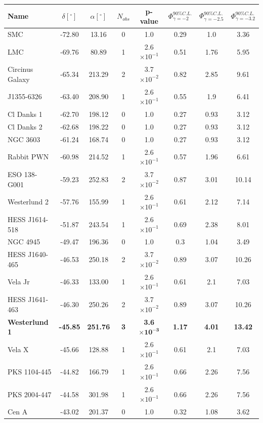 \begin{longtable}{lccccccc}
\hline
Name	&	$\delta [^{\circ}]$	&	$\alpha [^{\circ}]$	&	$N_{obs}$	&	p-value	&	$\Phi^{90\% C.L.}_{\gamma = -2}$	&	$\Phi^{90\% C.L.}_{\gamma = -2.5}$	&	$\Phi^{90\% C.L.}_{\gamma = -3.2}$   \\ \hline
\endhead 
SMC	&	-72.80	&	13.16	&	0	&	1.0	&	0.29	&	1.0	&	3.36	\\ 
LMC	&	-69.76	&	80.89	&	1	&	2.6$\times 10^{-1}$	&	0.51	&	1.76	&	5.95	\\ 
Circinus Galaxy	&	-65.34	&	213.29	&	2	&	3.7$\times 10^{-2}$	&	0.82	&	2.85	&	9.61	\\ 
J1355-6326	&	-63.40	&	208.90	&	1	&	2.6$\times 10^{-1}$	&	0.55	&	1.9	&	6.41	\\ 
Cl Danks 1	&	-62.70	&	198.12	&	0	&	1.0	&	0.27	&	0.93	&	3.12	\\ 
Cl Danks 2	&	-62.68	&	198.22	&	0	&	1.0	&	0.27	&	0.93	&	3.12	\\ 
NGC 3603	&	-61.24	&	168.74	&	0	&	1.0	&	0.27	&	0.93	&	3.12	\\ 
Rabbit PWN	&	-60.98	&	214.52	&	1	&	2.6$\times 10^{-1}$	&	0.57	&	1.96	&	6.61	\\ 
ESO 138-G001	&	-59.23	&	252.83	&	2	&	3.7$\times 10^{-2}$	&	0.87	&	3.01	&	10.14	\\ 
Westerlund 2	&	-57.76	&	155.99	&	1	&	2.6$\times 10^{-1}$	&	0.61	&	2.12	&	7.14	\\ 
HESS J1614-518	&	-51.87	&	243.54	&	1	&	2.6$\times 10^{-1}$	&	0.69	&	2.38	&	8.01	\\ 
NGC 4945	&	-49.47	&	196.36	&	0	&	1.0	&	0.3	&	1.04	&	3.49	\\ 
HESS J1640-465	&	-46.53	&	250.18	&	2	&	3.7$\times 10^{-2}$	&	0.89	&	3.07	&	10.26	\\ 
Vela Jr	&	-46.33	&	133.00	&	1	&	2.6$\times 10^{-1}$	&	0.61	&	2.1	&	7.03	\\ 
HESS J1641-463	&	-46.30	&	250.26	&	2	&	3.7$\times 10^{-2}$	&	0.89	&	3.07	&	10.26	\\ 
{\bf Westerlund 1}	&	{\bf -45.85}	&	{\bf 251.76}	&	{\bf 3}	&	{\bf 3.6$\boldsymbol{\times 10^{-3}}$}	&	{\bf 1.17}	&	{\bf 4.01}	&	{\bf 13.42}	\\ 
Vela X	&	-45.66	&	128.88	&	1	&	2.6$\times 10^{-1}$	&	0.61	&	2.1	&	7.03	\\ 
PKS 1104-445	&	-44.82	&	166.79	&	1	&	2.6$\times 10^{-1}$	&	0.66	&	2.26	&	7.56	\\ 
PKS 2004-447	&	-44.58	&	301.98	&	1	&	2.6$\times 10^{-1}$	&	0.66	&	2.26	&	7.56	\\ 
Cen A	&	-43.02	&	201.37	&	0	&	1.0	&	0.32	&	1.08	&	3.62	\\ 

\end{longtable}
